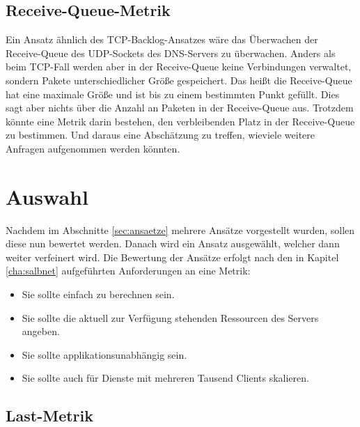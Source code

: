 \documentclass[a4paper, 12pt, BCOR10mm, DIV12, toc=bibliography, toc=listof, german]{scrbook}
\begin{document}

		\subsection*{Receive-Queue-Metrik} %

		Ein Ansatz ähnlich des TCP-Backlog-Ansatzes \cite{zinke2007,scsczile2008} wäre das Überwachen
		der Receive-Queue des UDP-Sockets des DNS-Servers zu überwachen. Anders als beim TCP-Fall werden
		aber in der Receive-Queue keine Verbindungen verwaltet, sondern Pakete unterschiedlicher Größe
		gespeichert. Das heißt die Receive-Queue hat eine maximale Größe und ist bis zu einem bestimmten
		Punkt gefüllt. Dies sagt aber nichts über die Anzahl an Paketen in der Receive-Queue aus.
		Trotzdem könnte eine Metrik darin bestehen, den verbleibenden Platz in der Receive-Queue zu
		bestimmen. Und daraus eine Abschätzung zu treffen, wieviele weitere Anfragen aufgenommen werden
		könnten.

		

		\section{Auswahl} %
		\label{sec:auswahl}

		Nachdem im Abschnitte \ref{sec:ansaetze} mehrere Ansätze vorgestellt wurden, sollen diese nun
		bewertet werden. Danach wird ein Ansatz ausgewählt, welcher dann weiter verfeinert wird. Die
		Bewertung der Ansätze erfolgt nach den in Kapitel \ref{cha:salbnet} aufgeführten Anforderungen
		an eine Metrik:

		\begin{itemize}
			\item Sie sollte einfach zu berechnen sein.
			\item Sie sollte die aktuell zur Verfügung stehenden Ressourcen des Servers angeben.
			\item Sie sollte applikationsunabhängig sein.
			\item Sie sollte auch für Dienste mit mehreren Tausend Clients skalieren.
		\end{itemize}

		\subsection*{Last-Metrik} %
\end{document}
